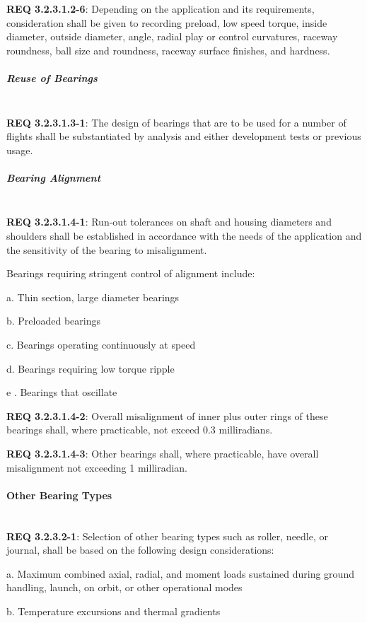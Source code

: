 \documentclass[12pt]{article}
\begin{document}
\noindent \textbf{REQ 3.2.3.1.2-6}: Depending on the application and its requirements, consideration shall be given to recording preload, low speed torque, inside diameter, outside diameter, angle, radial play or control curvatures, raceway roundness, ball size and roundness, raceway surface finishes, and hardness.


\subparagraph{Reuse of Bearings} \mbox{} \\ %
\noindent \textbf{REQ 3.2.3.1.3-1}: The design of bearings that are to be used for a number of flights shall be substantiated by analysis and either development tests or previous usage.


\subparagraph{Bearing Alignment} \mbox{} \\ %
\noindent \textbf{REQ 3.2.3.1.4-1}: Run-out tolerances on shaft and housing diameters and shoulders shall be established in accordance with the needs of the application and the sensitivity of the bearing to misalignment. 

Bearings requiring stringent control of alignment include:

a. Thin section, large diameter bearings

b. Preloaded bearings

c. Bearings operating continuously at speed

d. Bearings requiring low torque ripple

e . Bearings that oscillate

\noindent \textbf{REQ 3.2.3.1.4-2}: Overall misalignment of inner plus outer rings of these bearings shall, where practicable, not exceed 0.3 milliradians.

\noindent \textbf{REQ 3.2.3.1.4-3}: Other bearings shall, where practicable, have overall misalignment not exceeding 1 milliradian.


\paragraph{Other Bearing Types} \mbox{} \\ %
\noindent \textbf{REQ 3.2.3.2-1}: Selection of other bearing types such as roller, needle, or journal, shall be based on the following design considerations:

a. Maximum combined axial, radial, and moment loads sustained during ground handling, launch, on orbit, or other operational modes

b. Temperature excursions and thermal gradients
\end{document}
